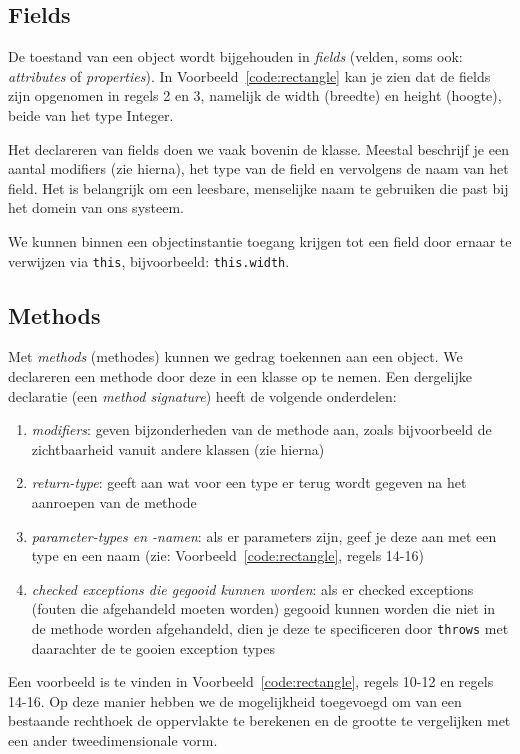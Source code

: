\documentclass[dutch,a4paper,12pt,doubleside]{book}
\begin{document}
\subsection{Fields}
De toestand van een object wordt bijgehouden in \textit{fields}
(velden, soms ook: \textit{attributes} of \textit{properties}).
In Voorbeeld~\ref{code:rectangle} kan je zien dat de fields zijn opgenomen in regels
2 en 3, namelijk de width (breedte) en height (hoogte), beide van het type Integer.

Het declareren van fields doen we vaak bovenin de klasse. Meestal beschrijf je een 
aantal modifiers (zie hierna), het type van de field en vervolgens 
de naam van het field. Het is belangrijk om een leesbare, menselijke naam te gebruiken 
die past bij het domein van ons systeem. 

We kunnen binnen een objectinstantie toegang krijgen tot 
een field door ernaar te verwijzen via \texttt{this}, bijvoorbeeld: \texttt{this.width}.

\subsection{Methods}
Met \textit{methods} (methodes) kunnen we gedrag toekennen aan een object.
We declareren een methode door deze in een klasse op te nemen. Een dergelijke 
declaratie (een \textit{method signature}) heeft de volgende onderdelen:
\begin{enumerate}
    \item \textit{modifiers}: geven bijzonderheden van de methode aan, 
    zoals bijvoorbeeld de zichtbaarheid vanuit andere klassen (zie hierna)
    \item \textit{return-type}: geeft aan wat voor een type er terug wordt gegeven 
    na het aanroepen van de methode
    \item \textit{parameter-types en -namen}: als er parameters zijn, 
    geef je deze aan met een type en een naam (zie: Voorbeeld~\ref{code:rectangle}, regels 14-16)
    \item \textit{checked exceptions die gegooid kunnen worden}: 
    als er checked exceptions (fouten die afgehandeld moeten worden) gegooid kunnen worden
    die niet in de methode worden afgehandeld, dien je deze te specificeren door \texttt{throws} 
    met daarachter de te gooien exception types
\end{enumerate}

Een voorbeeld is te vinden in Voorbeeld~\ref{code:rectangle}, regels 10-12 en regels 14-16.
Op deze manier hebben we de mogelijkheid toegevoegd om van een bestaande rechthoek
de oppervlakte te berekenen en de grootte te vergelijken met een ander tweedimensionale vorm.
\end{document}
